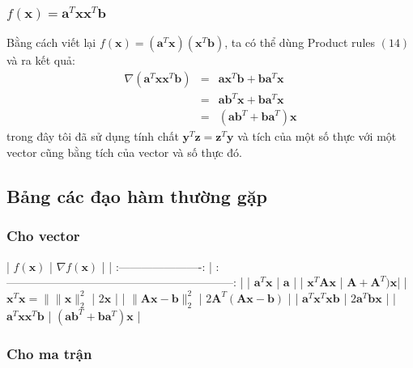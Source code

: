 \documentclass[12pt]{article}
\begin{document}
\subsubsection{$f(\mathbf{x}) = \mathbf{a}^T\mathbf{x}\mathbf{x}^T\mathbf{b}$}
Bằng cách viết lại $f(\mathbf{x}) = (\mathbf{a}^T\mathbf{x})(\mathbf{x}^T\mathbf{b})$, ta có thể dùng Product rules $(14)$ và ra kết quả:  
\begin{eqnarray} 
\nabla (\mathbf{a}^T\mathbf{x}\mathbf{x}^T\mathbf{b}) &=& \mathbf{a} \mathbf{x}^T\mathbf{b} +  \mathbf{b}\mathbf{a}^T\mathbf{x} \\\ 
&=& \mathbf{ab}^T\mathbf{x} + \mathbf{b}\mathbf{a}^T\mathbf{x}\\\ 
&=& (\mathbf{ab}^T + \mathbf{ba}^T)\mathbf{x} 
\end{eqnarray} 
trong đây tôi đã sử dụng tính chất $\mathbf{y}^T\mathbf{z} = \mathbf{z}^T\mathbf{y}$ và tích của một số thực với một vector cũng bằng tích của vector và số thực đó.  
 
 
\subsection{Bảng các đạo hàm thường gặp}
 
\subsubsection{Cho vector }
 
| $f(\mathbf{x}) $           | $ \nabla f(\mathbf{x}) $     |          
| :----------------------:       | :------------------------------------------------------------: |          
| $\mathbf{a}^T \mathbf{x} $ | $\mathbf{a}$                                               |   
| $\mathbf{x}^T\mathbf{Ax}$  | $\mathbf{A} + \mathbf{A}^T) \mathbf{x}$|        
| $\mathbf{x}^T \mathbf{x} =  \| \|\mathbf{x} \|_2^2 $  | $2\mathbf{x}  $     | 
| $ \|\mathbf{Ax-b} \|_2^2 $  | $ 2\mathbf{A}^T (\mathbf{Ax - b})$      |          
| $\mathbf{a}^T\mathbf{x}^T\mathbf{xb} $ |  $2\mathbf{a}^T\mathbf{bx} $ | 
| $\mathbf{a}^T\mathbf{x}\mathbf{x}^T\mathbf{b} $ |  $ (\mathbf{a}\mathbf{b}^T + \mathbf{b}\mathbf{a}^T) \mathbf{x} $ | 
 
 
\subsubsection{Cho ma trận}
 
\end{document}

